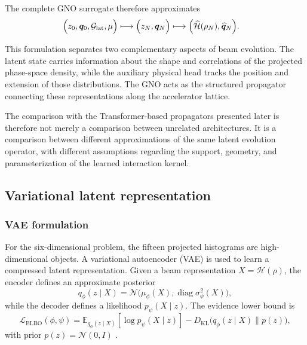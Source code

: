 \documentclass[11pt,a4paper]{article}
\providecommand{\E}{\mathbb{E}}
\providecommand{\KL}{D_{\mathrm{KL}}}
\begin{document}
\begin{sloppypar}
The complete GNO surrogate therefore approximates
\begin{equation}
\begin{split}
&
\Bigl(
z_0,
\bm q_0,
\mathcal{G}_{\mathrm{lat}},
\mu
\Bigr)
\longmapsto
\Bigl(
z_N,
\bm q_N
\Bigr)
\longmapsto
\Bigl(
\widehat{\mathcal{H}}(\rho_N),
\widehat{\bm q}_N
\Bigr).
\end{split}
\label{eq:gno_complete_surrogate}
\end{equation}

This formulation separates two complementary aspects of beam evolution. The latent state carries information about the shape and correlations of the projected phase-space density, while the auxiliary physical head tracks the position and extension of those distributions. The GNO acts as the structured propagator connecting these representations along the accelerator lattice.

The comparison with the Transformer-based propagators presented later is therefore not merely a comparison between unrelated architectures. It is a comparison between different approximations of the same latent evolution operator, with different assumptions regarding the support, geometry, and parameterization of the learned interaction kernel.


\subsection{Variational latent representation}
\subsubsection{VAE formulation}
For the six-dimensional problem, the fifteen projected histograms are high-dimensional objects. A variational autoencoder (VAE) is used to learn a compressed latent representation. Given a beam representation $X=\mathcal{H}(\rho)$, the encoder defines an approximate posterior
\begin{equation}
    q_{\phi}(z\mid X)=\mathcal{N}\big(\mu_{\phi}(X),\operatorname{diag}\sigma_{\phi}^{2}(X)\big),
\end{equation}
while the decoder defines a likelihood $p_{\psi}(X\mid z)$. The evidence lower bound is
\begin{equation}
    \mathcal{L}_{\mathrm{ELBO}}(\phi,\psi)=\E_{q_{\phi}(z\mid X)}[\log p_{\psi}(X\mid z)]-\KL\big(q_{\phi}(z\mid X)\|p(z)\big),
    \label{eq:vae_elbo_revised}
\end{equation}
with prior $p(z)=\mathcal{N}(0,I)$ \cite{kingma_autoencoding_2014}.


\end{sloppypar}
\end{document}
